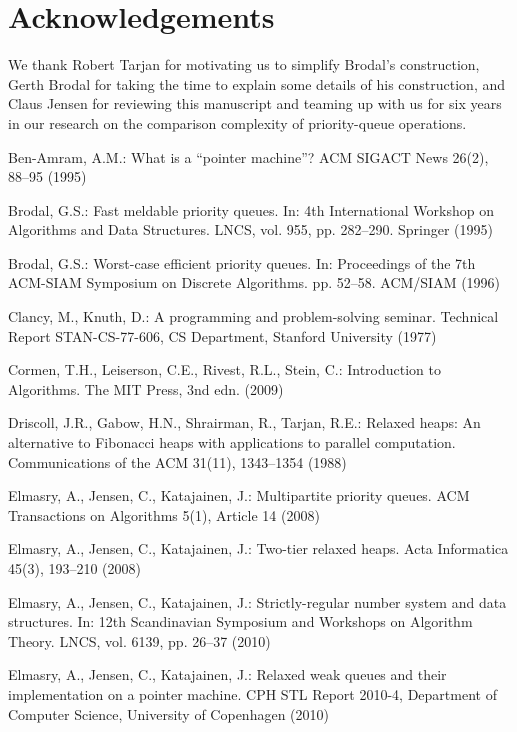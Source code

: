 \documentclass{llncs}
\begin{document}
\section*{Acknowledgements}

We thank Robert Tarjan for motivating us to simplify Brodal's
construction, Gerth Brodal for taking the time to explain some details
of his construction, and Claus Jensen for reviewing this manuscript
and teaming up with us for six years in our research on the comparison
complexity of priority-queue operations.


\begin{thebibliography}{10}
\providecommand{\url}[1]{\texttt{#1}}
\providecommand{\urlprefix}{URL }

Ben-Amram, A.M.: What is a ``pointer machine''? ACM SIGACT News  26(2),  88--95
  (1995)

Brodal, G.S.: Fast meldable priority queues. In: 4th International Workshop on
  Algorithms and Data Structures. LNCS, vol. 955, pp. 282--290. Springer (1995)

Brodal, G.S.: Worst-case efficient priority queues. In: Proceedings of the 7th
  ACM-SIAM Symposium on Discrete Algorithms. pp. 52--58. ACM/SIAM (1996)

Clancy, M., Knuth, D.: A programming and problem-solving seminar. Technical
  Report STAN-CS-77-606, CS Department, Stanford University (1977)

Cormen, T.H., Leiserson, C.E., Rivest, R.L., Stein, C.: Introduction to
  Algorithms. The MIT Press, 3nd edn. (2009)

Driscoll, J.R., Gabow, H.N., Shrairman, R., Tarjan, R.E.: Relaxed heaps: {A}n
  alternative to {F}ibonacci heaps with applications to parallel computation.
  Communications of the ACM  31(11),  1343--1354 (1988)

Elmasry, A., Jensen, C., Katajainen, J.: Multipartite priority queues. ACM
  Transactions on Algorithms  5(1),  Article 14 (2008)

Elmasry, A., Jensen, C., Katajainen, J.: Two-tier relaxed heaps. Acta
  Informatica  45(3),  193--210 (2008)

Elmasry, A., Jensen, C., Katajainen, J.: Strictly-regular number system and
  data structures. In: 12th Scandinavian Symposium and Workshops on Algorithm
  Theory. LNCS, vol. 6139, pp. 26--37 (2010)

Elmasry, A., Jensen, C., Katajainen, J.: Relaxed weak queues and their
  implementation on a pointer machine. CPH STL Report 2010-4, Department of
  Computer Science, University of Copenhagen (2010)


\end{thebibliography}
\end{document}
